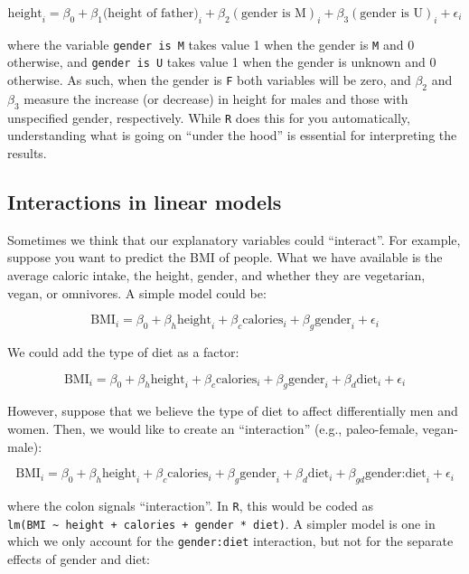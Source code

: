 \documentclass[
  letterpaper,
  DIV=11,
  numbers=noendperiod]{scrreprt}
\begin{document}
\[
 \text{height}_i = \beta_0 + \beta_1 \text{(height of father)}_i + \beta_2 (\text{gender is M})_i + \beta_3 (\text{gender is U})_i + \epsilon_i
\]

where the variable \texttt{gender\ is\ M} takes value 1 when the gender
is \texttt{M} and 0 otherwise, and \texttt{gender\ is\ U} takes value 1
when the gender is unknown and 0 otherwise. As such, when the gender is
\texttt{F} both variables will be zero, and \(\beta_2\) and \(\beta_3\)
measure the increase (or decrease) in height for males and those with
unspecified gender, respectively. While \texttt{R} does this for you
automatically, understanding what is going on ``under the hood'' is
essential for interpreting the results.

\hypertarget{interactions-in-linear-models}{%
\subsection{Interactions in linear
models}\label{interactions-in-linear-models}}

Sometimes we think that our explanatory variables could ``interact''.
For example, suppose you want to predict the BMI of people. What we have
available is the average caloric intake, the height, gender, and whether
they are vegetarian, vegan, or omnivores. A simple model could be:

\[
\text{BMI}_i = \beta_0 + \beta_h \text{height}_i + \beta_c \text{calories}_i + \beta_g \text{gender}_i + \epsilon_i
\]

We could add the type of diet as a factor:

\[
\text{BMI}_i = \beta_0 + \beta_h \text{height}_i + \beta_c \text{calories}_i + \beta_g \text{gender}_i + \beta_d \text{diet}_i + \epsilon_i
\]

However, suppose that we believe the type of diet to affect
differentially men and women. Then, we would like to create an
``interaction'' (e.g., paleo-female, vegan-male):

\[
\text{BMI}_i = \beta_0 + \beta_h \text{height}_i + \beta_c \text{calories}_i + \beta_g \text{gender}_i + \beta_d \text{diet}_i + \beta_{gd} \text{gender:diet}_i + \epsilon_i
\]

where the colon signals ``interaction''. In \texttt{R}, this would be
coded as
\texttt{lm(BMI\ \textasciitilde{}\ height\ +\ calories\ +\ gender\ *\ diet)}.
A simpler model is one in which we only account for the
\texttt{gender:diet} interaction, but not for the separate effects of
gender and diet:
\end{document}
